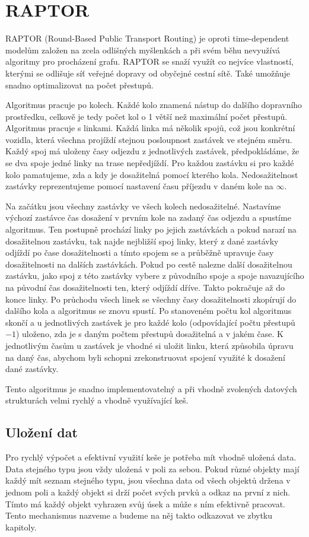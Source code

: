 \section{RAPTOR}
RAPTOR (Round-Based Public Transport Routing) \citep*{RAPTOR} je oproti
time-dependent modelům založen na zcela odlišných myšlenkách a při svém běhu
nevyužívá algoritmy pro procházení grafu. RAPTOR se snaží využít co nejvíce vlastností,
kterými se odlišuje síť veřejné dopravy od obyčejné cestní sítě. Také umožňuje
snadno optimalizovat na počet přestupů.

Algoritmus pracuje po kolech. Každé kolo znamená nástup do dalšího dopravního
prostředku, celkově je tedy počet kol o 1 větší než maximální počet přestupů.
Algoritmus pracuje s linkami. Každá linka má několik spojů, což jsou konkrétní
vozidla, která všechna projíždí stejnou posloupnost zastávek ve stejném směru. Každý spoj má
uloženy časy odjezdu z jednotlivých zastávek, předpokládáme, že se dva spoje
jedné linky na trase nepředjíždí. Pro každou zastávku si pro každé kolo
pamatujeme, zda a kdy je dosažitelná pomocí kterého kola. Nedosažitelnost
zastávky reprezentujeme pomocí nastavení času příjezdu v daném kole na $\infty$.

Na začátku jsou všechny zastávky ve všech kolech nedosažitelné. Nastavíme
výchozí zastávce čas dosažení v prvním kole na zadaný čas odjezdu a spustíme
algoritmus. Ten postupně prochází linky po jejich zastávkách a pokud narazí na
dosažitelnou zastávku, tak najde nejbližší spoj linky, který z dané zastávky
odjíždí po čase dosažitelnosti a tímto spojem se  a průběžně upravuje
časy dosažitelnosti na dalších zastávkách. Pokud po cestě nalezne další
dosažitelnou zastávku, jako spoj z této zastávky vybere z původního spoje a
spoje navazujícího na původní čas dosažitelnosti ten, který odjíždí dříve. Takto
pokračuje až do konce linky. Po průchodu všech linek se všechny časy
dosažitelnosti zkopírují do dalšího kola a algoritmus se znovu spustí. Po
stanoveném počtu kol algoritmus skončí a u jednotlivých zastávek je pro každé
kolo (odpovídající počtu přestupů $- 1$) uloženo, zda je s daným počtem přestupů
dosažitelná a v jakém čase. K jednotlivým časům u zastávek je vhodné si uložit
linku, která způsobila úpravu na daný čas, abychom byli schopni zrekonstruovat
spojení využité k dosažení dané zastávky. 

Tento algoritmus je snadno implementovatelný a při vhodně zvolených datových
strukturách velmi rychlý a vhodně využívající keš. 

\subsection{Uložení dat}
Pro rychlý výpočet a efektivní využití keše je potřeba mít vhodně uložená data.
Data stejného typu jsou vždy uložená v poli za sebou. Pokud různé objekty mají
každý mít seznam stejného typu, jsou všechna data od všech objektů držena v
jednom poli a každý objekt si drží počet svých prvků a odkaz na první z nich.
Tímto má každý objekt vyhrazen svůj úsek a může s ním efektivně pracovat. Tento
mechanismus nazveme  a budeme na něj takto odkazovat ve
zbytku kapitoly.

